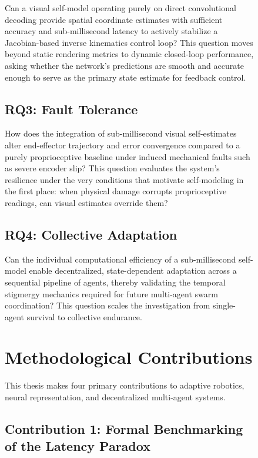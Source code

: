 \documentclass[12pt,a4paper,oneside]{report}
\begin{document}
\begin{figure}[H]
Can a visual self-model operating purely on direct convolutional decoding provide spatial coordinate estimates with sufficient accuracy and sub-millisecond latency to actively stabilize a Jacobian-based inverse kinematics control loop? This question moves beyond static rendering metrics to dynamic closed-loop performance, asking whether the network's predictions are smooth and accurate enough to serve as the primary state estimate for feedback control.

\subsection{RQ3: Fault Tolerance}
\label{subsec:RQ3_intro}

How does the integration of sub-millisecond visual self-estimates alter end-effector trajectory and error convergence compared to a purely proprioceptive baseline under induced mechanical faults such as severe encoder slip? This question evaluates the system's resilience under the very conditions that motivate self-modeling in the first place: when physical damage corrupts proprioceptive readings, can visual estimates override them?

\subsection{RQ4: Collective Adaptation}
\label{subsec:RQ4_intro}

Can the individual computational efficiency of a sub-millisecond self-model enable decentralized, state-dependent adaptation across a sequential pipeline of agents, thereby validating the temporal stigmergy mechanics required for future multi-agent swarm coordination? This question scales the investigation from single-agent survival to collective endurance.

\section{Methodological Contributions}
\label{sec:methodological_contributions_intro}

This thesis makes four primary contributions to adaptive robotics, neural representation, and decentralized multi-agent systems.

\subsection{Contribution 1: Formal Benchmarking of the Latency Paradox}
\label{subsec:contrib_benchmarking_intro}


\end{figure}
\end{document}

